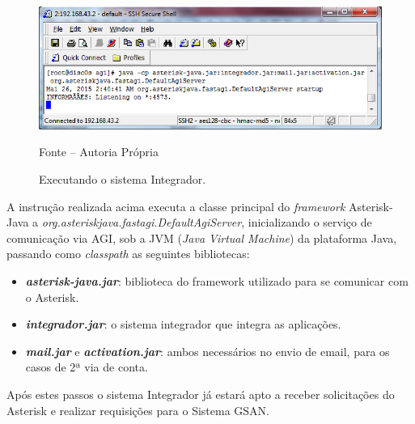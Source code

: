 \begin{figure}[!htb]
	\centering
	\includegraphics{figuras/executar_integrador.png}
	\caption{Executando o sistema Integrador.}	
	\label{figura:executarIntegrador}
	Fonte – Autoria Própria
\end{figure}


A instrução realizada acima executa a classe principal do \textit{framework} Asterisk-Java a \textit{ org.asteriskjava.fastagi.DefaultAgiServer}, inicializando o serviço de comunicação via AGI, sob a JVM (\textit{Java Virtual Machine}) da plataforma Java, passando como \textit{classpath} as seguintes bibliotecas: 

\begin{itemize}
	\item \textbf{\textit{asterisk-java.jar}}: biblioteca do framework utilizado para se comunicar com o Asterisk.
	\item \textbf{\textit{integrador.jar}}: o sistema integrador que integra as aplicações.
	\item \textbf{\textit{mail.jar}} e \textbf{\textit{activation.jar}}: ambos necessários no envio de email, para os casos de 2ª via de conta.	
\end{itemize}

Após estes passos o sistema Integrador já estará apto a receber solicitações do Asterisk e realizar requisições para o Sistema GSAN.